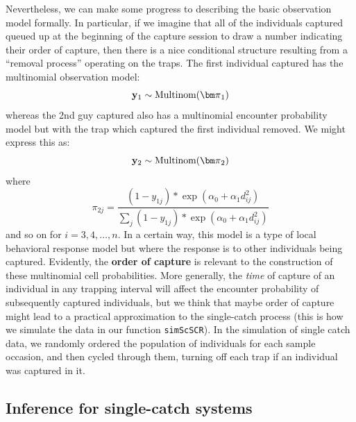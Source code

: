 Nevertheless, we can make some progress to describing the basic
observation model
formally. In particular, if we imagine that all of the individuals
captured queued up at the beginning of the capture session to draw a
number indicating their order of capture, then there is a nice conditional structure
resulting from a ``removal process'' operating on the traps.  The
first individual captured has the multinomial observation model:
\[
{\bf y}_{1} \sim \mbox{Multinom}({\bm \pi}_{1})
\]
whereas the 2nd guy captured also has a multinomial encounter
probability model but with the trap which captured the first
individual removed. We might express this as:
\[
{\bf y}_{2} \sim \mbox{Multinom}({\bm \pi}_{2})
\]
where
\[
 \pi_{2j}  = \frac{ (1-y_{1j}) * \exp( \alpha_{0} + \alpha_{1}   d_{ij}^{2}) }
{ \sum_{j} (1-y_{1j}) * \exp( \alpha_{0} + \alpha_{1}   d_{ij}^{2}) }
\]
and so on for $i=3,4,\ldots,n$.
 In a certain way, this model is a type of local behavioral
response model but where the response is to other individuals being
captured.  
Evidently, the {\bf order of capture} is relevant to the
construction of these multinomial cell probabilities. More generally,
the {\it time} of capture of an individual in any trapping interval
will affect the encounter probability of subsequently captured
individuals, but we think that maybe order of capture might lead to a
practical approximation to the single-catch process (this is how we
simulate the data in our function \mbox{\tt simScSCR}).
In the
simulation of single catch data, we randomly ordered the population of
individuals for each sample occasion, 
and then cycled through them, turning off each trap if an individual
was captured in it.  


\subsection{Inference for single-catch systems}

